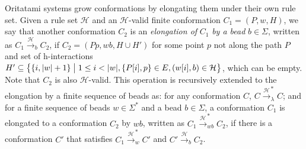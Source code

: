 \documentclass[runningheads]{llncs}
\begin{document}
Oritatami systems grow conformations by elongating them under their own rule set. 
Given a rule set $\mathcal{H}$ and an $\mathcal{H}$-valid finite conformation $C_1 = (P, w, H)$, 
we say that another conformation $C_2$ is an \textit{elongation of} $C_1$ \textit{by a bead} $b \in \Sigma$, written as $C_1 \xrightarrow{\mathcal{H}}_b C_2$, if $C_2 = (Pp, wb, H \cup H')$ for some point $p$ not along the path $P$ and set of h-interactions $H' \subseteq \left\{ \{i, |w|+1\} \bigm| 1\leq i < |w|, \{P[i], p\} \in E, (w[i], b) \in \mathcal{H}\right\}$, which can be empty.
Note that $C_2$ is also $\mathcal{H}$-valid.
This operation is recursively extended to the elongation by a finite sequence of beads as: 
for any conformation $C$, $C \xrightarrow{\mathcal{H}}^*_\lambda C$; 
and for a finite sequence of beads $w \in \Sigma^*$ and a bead $b \in \Sigma$,
a conformation $C_1$ is elongated to a conformation $C_2$ by $wb$,
written as $C_1 \xrightarrow{\mathcal{H}}^*_{wb} C_2$, if there is a conformation $C'$ that satisfies
$C_1 \xrightarrow{\mathcal{H}}^*_w C'$ and $C' \xrightarrow{\mathcal{H}}_b C_2$.
\end{document}
